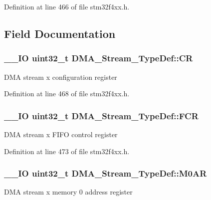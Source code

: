 Definition at line 466 of file stm32f4xx.\-h.



\subsection{Field Documentation}
\hypertarget{struct_d_m_a___stream___type_def_af893adc5e821b15d813237b2bfe4378b}{
\subsubsection[{C\-R}]{\setlength{\rightskip}{0pt plus 5cm}\-\_\-\-\_\-\-I\-O {\bf uint32\-\_\-t} D\-M\-A\-\_\-\-Stream\-\_\-\-Type\-Def\-::\-C\-R}}\label{struct_d_m_a___stream___type_def_af893adc5e821b15d813237b2bfe4378b}
D\-M\-A stream x configuration register 

Definition at line 468 of file stm32f4xx.\-h.

\hypertarget{struct_d_m_a___stream___type_def_aad3d78ab35e7af48951be5be53392f9f}{
\subsubsection[{F\-C\-R}]{\setlength{\rightskip}{0pt plus 5cm}\-\_\-\-\_\-\-I\-O {\bf uint32\-\_\-t} D\-M\-A\-\_\-\-Stream\-\_\-\-Type\-Def\-::\-F\-C\-R}}\label{struct_d_m_a___stream___type_def_aad3d78ab35e7af48951be5be53392f9f}
D\-M\-A stream x F\-I\-F\-O control register 

Definition at line 473 of file stm32f4xx.\-h.

\hypertarget{struct_d_m_a___stream___type_def_a965da718db7d0303bff185d367d96fd6}{
\subsubsection[{M0\-A\-R}]{\setlength{\rightskip}{0pt plus 5cm}\-\_\-\-\_\-\-I\-O {\bf uint32\-\_\-t} D\-M\-A\-\_\-\-Stream\-\_\-\-Type\-Def\-::\-M0\-A\-R}}\label{struct_d_m_a___stream___type_def_a965da718db7d0303bff185d367d96fd6}
D\-M\-A stream x memory 0 address register 

